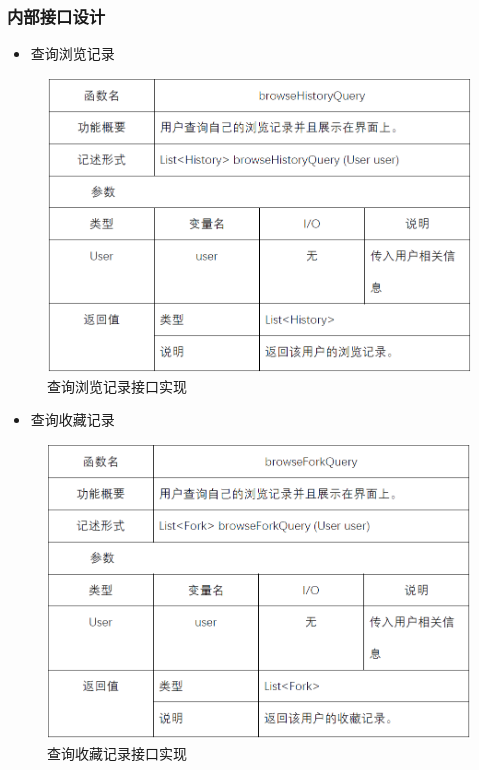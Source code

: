 \subsubsection{内部接口设计}
\begin{itemize}
	\item 查询浏览记录
\end{itemize}
\begin{figure}[!htbp]
	\centering
	\includegraphics[scale=0.75]{image/b11.png} %
	\caption{查询浏览记录接口实现} %
\end{figure}
\begin{itemize}
	\item 查询收藏记录
\end{itemize}
\begin{figure}[!htbp]
	\centering
	\includegraphics[scale=0.75]{image/b12.png} %
	\caption{查询收藏记录接口实现} %
\end{figure}

